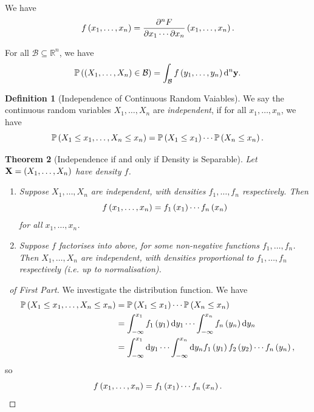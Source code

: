 \documentclass{article}
\newtheorem{theorem}{Theorem}[section]
\theoremstyle{definition}
\newtheorem{definition}[theorem]{Definition}
\theoremstyle{remark}
\newcommand{\RR}{\mathbb{R}}
\newcommand{\Prob}{\mathbb{P}}
\newcommand{\minusinfty}{-\infty}
\begin{document}
We have
\[
    f\left(x_1, \ldots, x_n\right) = \frac{\partial^n F}{\partial x_1 \cdots \partial x_n} \left(x_1, \ldots, x_n\right).
\]

For all \(\mathcal{B} \subseteq \RR^n\), we have
\[
    \Prob\pqty{\pqty{X_1, \ldots, X_n} \in \mathcal{B}} = \int_{\mathcal{B}} f \pqty{y_1, \ldots, y_n} \dd[n]{\vb{y}}.
\]

\begin{definition}[Independence of Continuous Random Vaiables]
    \label{def:independence-continuous-random-variables}%
    We say the continuous random variables \(X_1, \ldots, X_n\) are \emph{independent}, if for all \(x_1, \ldots, x_n\), we have
    \[
        \Prob\pqty{X_1 \leq x_1, \ldots, X_n \leq x_n} = \Prob\pqty{X_1 \leq x_1} \cdots \Prob\pqty{X_n \leq x_n}.
    \]
\end{definition}

\begin{theorem}[Independence if and only if Density is Separable]
    \label{thm:rv-independent-density-separable}%
    Let \(\vb{X} = \pqty{X_1, \ldots, X_n}\) have density \(f\).
    \begin{enumerate}
        \item Suppose \(X_1, \ldots, X_n\) are independent, with densities \(f_1, \ldots, f_n\) respectively. Then
        \[
            f\left(x_1, \ldots, x_n\right) = f_1\left(x_1\right) \cdots f_n\left(x_n\right)
        \]
        for all \(x_1, \ldots, x_n\).
        \item Suppose \(f\) factorises into above, for some non-negative functions \(f_1, \ldots, f_n\). Then \(X_1, \ldots, X_n\) are independent, with densities proportional to \(f_1, \ldots, f_n\) respectively (i.e. up to normalisation).
    \end{enumerate}
\end{theorem}

\begin{proof}[\proofname\ of First Part]
    We investigate the distribution function. We have
    \begin{align*}
        \Prob\pqty{X_1 \leq x_1, \ldots, X_n \leq x_n} &= \Prob\pqty{X_1 \leq x_1} \cdots \Prob\pqty{X_n \leq x_n} \\
        &= \int_{\minusinfty}^{x_1} f_1 \pqty{y_1} \dd{y_1} \cdots \int_{\minusinfty}^{x_n} f_n \pqty{y_n} \dd{y_n} \\
        &= \int_{\minusinfty}^{x_1} \dd{y_1} \cdots \int_{\minusinfty}^{x_n} \dd{y_n} f_1\pqty{y_1} f_2\pqty{y_2} \cdots f_n\pqty{y_n},
    \end{align*}
    so
    \[
        f\left(x_1, \ldots, x_n\right) = f_1\left(x_1\right) \cdots f_n\left(x_n\right).
    \]
\end{proof}
\end{document}
